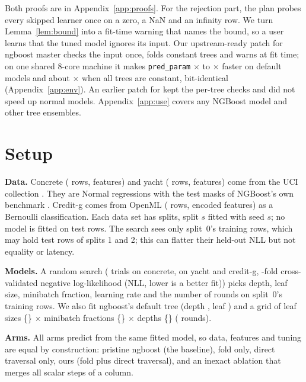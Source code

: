 \documentclass{article}
\begin{document}
Both proofs are in Appendix~\ref{app:proofs}. For the rejection part, the plan probes every skipped learner once on a zero, a NaN and an infinity row.
We turn Lemma~\ref{lem:bound} into a fit-time warning that names the bound, so a user learns that the tuned model ignores its input.
Our upstream-ready patch for ngboost master \texttt{\nPatchBase} checks the input once, folds constant trees and warns at fit time; on one shared 8-core machine it makes \texttt{pred\_param} \nPatchSpeedLo$\times$ to \nPatchSpeedHi$\times$ faster on default models and about \nPatchSpeedConst$\times$ when all trees are constant, bit-identical (Appendix~\ref{app:env}). An earlier patch for \nVerNgboost{} kept the per-tree checks and did not speed up normal models. Appendix~\ref{app:use} covers any NGBoost model and other tree ensembles.

\section{Setup}
\label{sec:setup}

\textbf{Data.} Concrete \citep{yeh1998concrete} (\nConcreteN{} rows, \nConcreteD{} features) and yacht (\nYachtN{} rows, \nYachtD{} features) come from the UCI collection \citep{dua2019uci}. They are Normal regressions with the test masks of NGBoost's own benchmark \citep{hernandez2015probabilistic,duan2020ngboost}. Credit-g comes from OpenML \citep{vanschoren2014openml} (\nCreditGN{} rows, \nCreditGD{} encoded features) as a Bernoulli classification. Each data set has \nConcreteSeeds{} splits, split $s$ fitted with seed $s$; no model is fitted on test rows. The search sees only split~0's training rows, which may hold test rows of splits 1 and 2; this can flatter their held-out NLL but not equality or latency.

\textbf{Models.} A random search (\nConcreteSearchTrials{} trials on concrete, \nYachtSearchTrials{} on yacht and credit-g, \nCVFolds-fold cross-validated negative log-likelihood (NLL, lower is a better fit)) picks depth, leaf size, minibatch fraction, learning rate and the number of rounds on split~0's training rows. We also fit ngboost's default tree (depth \nDefaultDepth, leaf \nDefaultLeaf) and a grid of leaf sizes \{\nGridLeafValues\} $\times$ minibatch fractions \{\nGridMinibatchValues\} $\times$ depths \{\nGridDepthValues\} (\nGridRounds{} rounds).

\textbf{Arms.} All arms predict from the same fitted model, so data, features and tuning are equal by construction: pristine ngboost \nVerNgboost{} (the baseline), fold only, direct traversal only, ours (fold plus direct traversal), and an inexact ablation that merges all scalar steps of a column.
\end{document}
